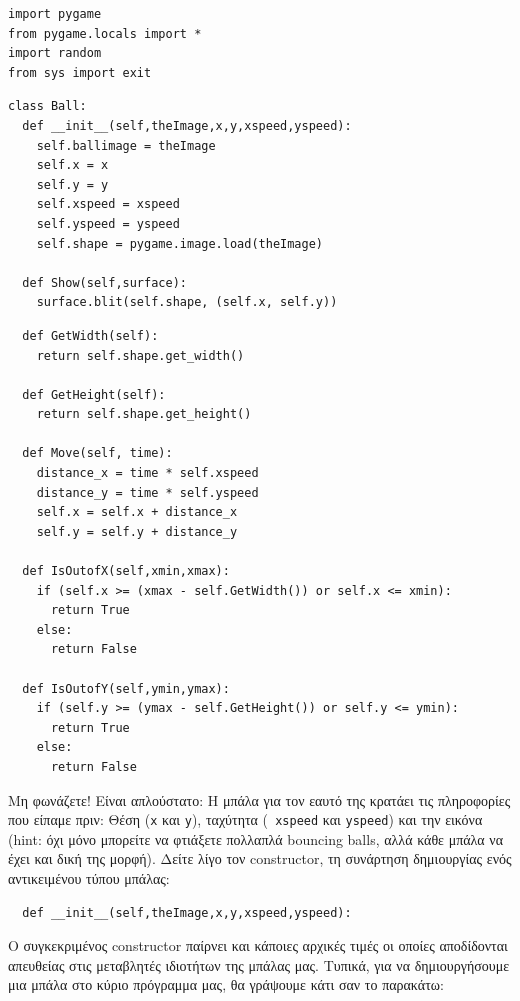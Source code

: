 \begin{verbatim}
import pygame
from pygame.locals import *
import random
from sys import exit
\end{verbatim}

\begin{verbatim}
class Ball:
  def __init__(self,theImage,x,y,xspeed,yspeed):
    self.ballimage = theImage
    self.x = x
    self.y = y
    self.xspeed = xspeed
    self.yspeed = yspeed
    self.shape = pygame.image.load(theImage)

  def Show(self,surface):
    surface.blit(self.shape, (self.x, self.y))
\end{verbatim}

\begin{verbatim}
  def GetWidth(self):
    return self.shape.get_width()

  def GetHeight(self):
    return self.shape.get_height()

  def Move(self, time):
    distance_x = time * self.xspeed
    distance_y = time * self.yspeed
    self.x = self.x + distance_x
    self.y = self.y + distance_y

  def IsOutofX(self,xmin,xmax):
    if (self.x >= (xmax - self.GetWidth()) or self.x <= xmin):
      return True
    else:
      return False

  def IsOutofY(self,ymin,ymax):
    if (self.y >= (ymax - self.GetHeight()) or self.y <= ymin):
      return True
    else:
      return False
\end{verbatim}

Μη φωνάζετε! Είναι απλούστατο: Η μπάλα για τον εαυτό της κρατάει τις
πληροφορίες που είπαμε πριν: Θέση ({\tt x} και {\tt y}), ταχύτητα ({\tt
xspeed} και {\tt yspeed}) και την εικόνα (hint: όχι μόνο μπορείτε να φτιάξετε πολλαπλά bouncing balls, αλλά κάθε μπάλα να έχει και δική της μορφή). Δείτε λίγο
τον constructor, τη συνάρτηση δημιουργίας ενός αντικειμένου τύπου
μπάλας:

\begin{verbatim}
  def __init__(self,theImage,x,y,xspeed,yspeed):
\end{verbatim}

O συγκεκριμένος constructor παίρνει και κάποιες αρχικές τιμές οι
οποίες αποδίδονται απευθείας στις μεταβλητές ιδιοτήτων της μπάλας μας.
Τυπικά, για να δημιουργήσουμε μια μπάλα στο κύριο πρόγραμμα μας, θα
γράψουμε κάτι σαν το παρακάτω:

